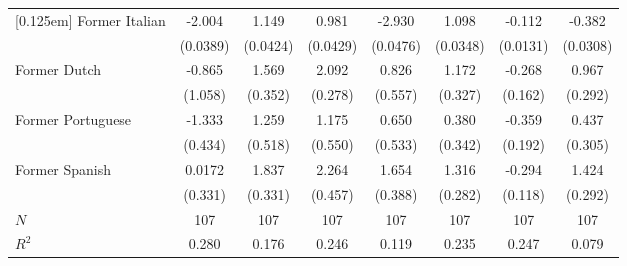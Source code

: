 \begin{sidewaystable}[h!]
\begin{threeparttable}
\begin{center}
\begin{minipage}{\textwidth}
\begin{tabular*}{\textwidth}{@{\extracolsep{\fill}}lccccccc@{\extracolsep{\fill}}}
[0.125em]
Former Italian &      -2.004\sym{***}&       1.149\sym{***}&       0.981\sym{***}&      -2.930\sym{***}&       1.098\sym{***}&      -0.112\sym{***}&      -0.382\sym{***}\\
            &    (0.0389)         &    (0.0424)         &    (0.0429)         &    (0.0476)         &    (0.0348)         &    (0.0131)         &    (0.0308)         \\
[0.125em]
Former Dutch &      -0.865         &       1.569\sym{***}&       2.092\sym{***}&       0.826         &       1.172\sym{***}&      -0.268         &       0.967\sym{***}\\
            &     (1.058)         &     (0.352)         &     (0.278)         &     (0.557)         &     (0.327)         &     (0.162)         &     (0.292)         \\
[0.125em]
Former Portuguese &      -1.333\sym{***}&       1.259\sym{**} &       1.175\sym{**} &       0.650         &       0.380         &      -0.359\sym{*}  &       0.437         \\
            &     (0.434)         &     (0.518)         &     (0.550)         &     (0.533)         &     (0.342)         &     (0.192)         &     (0.305)         \\
[0.125em]
Former Spanish &      0.0172         &       1.837\sym{***}&       2.264\sym{***}&       1.654\sym{***}&       1.316\sym{***}&      -0.294\sym{**} &       1.424\sym{***}\\
            &     (0.331)         &     (0.331)         &     (0.457)         &     (0.388)         &     (0.282)         &     (0.118)         &     (0.292)         \\
[0.125em]
\hline
\(N\)       &         107         &         107         &         107         &         107         &         107         &         107         &         107         \\
\(R^{2}\)   &       0.280         &       0.176         &       0.246         &       0.119         &       0.235         &       0.247         &       0.079         \\
\hline\hline
\end{tabular*}
\begin{tablenotes}
\small

\end{tablenotes}
\end{minipage}
\end{center}
\end{threeparttable}
\end{sidewaystable}
